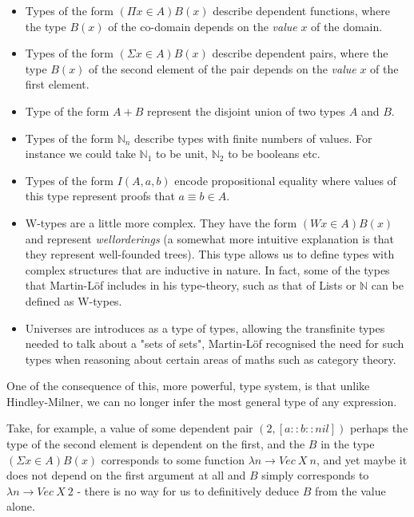           \begin{itemize}
          \item Types of the form $( \Pi x \in A ) B(x)$ describe
            dependent functions, where the type $B(x)$ of the co-domain
            depends on the \emph{value} $x$ of the domain.
          \item Types of the form $( \Sigma x \in A ) B(x)$ describe
            dependent pairs, where the type $B(x)$ of the second
            element of the pair depends on the \emph{value} $x$ of the
            first element.
          \item Type of the form $A + B$ represent the disjoint union
            of two types $A$ and $B$.
          \item Types of the form $\mathbb{N}_n$ describe types
            with finite numbers of values. For instance we could take
            $\mathbb{N}_1$ to be unit, $\mathbb{N}_2$ to be booleans
            etc.
          \item Types of the form $I (A , a , b)$ encode propositional
            equality where values of this type represent proofs
            that $a \equiv b \in A$.
          \item W-types are a little more complex. They have the form
            $( W x \in A ) B(x)$ and represent \emph{wellorderings} (a
            somewhat more intuitive explanation is that they represent
            well-founded trees). This type allows us to define types
            with complex structures that are inductive in nature. In fact,
            some of the types that Martin-Löf includes in his
            type-theory, such as that of Lists or $\mathbb{N}$ can be
            defined as W-types.
          \item Universes are introduces as a type of types, allowing
            the transfinite types needed to talk about a "sets of
            sets", Martin-Löf recognised the need for such types when
            reasoning about certain areas of maths such as category
            theory.
          \end{itemize}

          One of the consequence of this, more powerful, type system,
          is that unlike Hindley-Milner, we can no longer infer the
          most general type of any expression.

          Take, for example, a value of some dependent pair $(2 , [a :: b
            :: nil])$ perhaps the type of the second element is
          dependent on the first, and the $B$ in the type $(
          \Sigma x \in A ) B(x)$ corresponds to some function $\lambda
          n \to Vec \: X \: n$, and yet maybe it does not depend on the first
          argument at all and $B$ simply corresponds to $\lambda n \to
          Vec \: X \: 2$ - there is no way for us to definitively
          deduce $B$ from the value alone.
